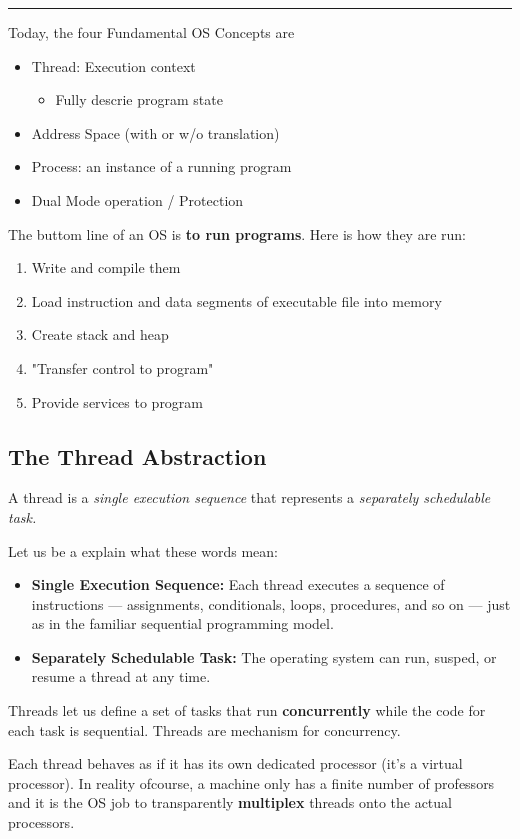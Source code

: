 \documentclass{article}
\begin{document}
\newpage


\hrule


Today, the four Fundamental OS Concepts are
\begin{itemize}
    \item Thread: Execution context
          \begin{itemize}
              \item Fully descrie program state
          \end{itemize}
    \item Address Space (with or w/o translation)
    \item Process: an instance of a running program
    \item Dual Mode operation / Protection
\end{itemize}

The buttom line of an OS is \textbf{to run programs}. Here is how they are run:
\begin{enumerate}
    \item Write and compile them
    \item Load instruction and data segments of executable file into memory
    \item Create stack and heap
    \item "Transfer control to program"
    \item Provide services to program
\end{enumerate}

\newpage
{}

\subsection{The Thread Abstraction}
\begin{definition}[Thread]
    A thread is a \textit{single execution sequence} that represents a \textit{separately schedulable task.}

    Let us be a explain what these words mean:
    \begin{itemize}
        \item \textbf{Single Execution Sequence:} Each thread executes a sequence of instructions --- assignments, conditionals, loops, procedures, and so on --- just as in the familiar sequential programming model.
        \item \textbf{Separately Schedulable Task:} The operating system can run, susped, or resume a thread at any time.
    \end{itemize}
    Threads let us define a set of tasks that run \textbf{concurrently} while the code for each task is sequential. Threads are mechanism for concurrency.
\end{definition}
Each thread behaves as if it has its own dedicated processor (it's a virtual processor). In reality ofcourse, a machine only has a finite number of professors and it is the OS job to transparently \textbf{multiplex} threads onto the actual processors.
\end{document}
